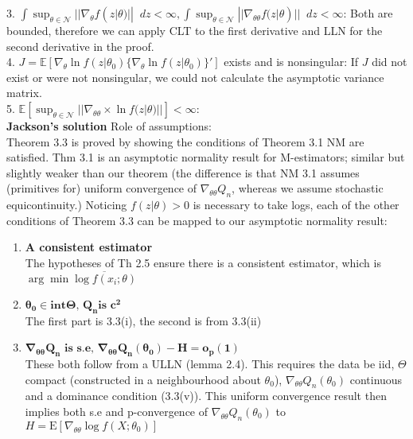 \documentclass[11pt,letterpaper]{article}                  %
\newcommand*\diff{\mathop{}\!d} %
\begin{document}
\begin{problem}
3. $\int \sup_{\theta \in \mathcal{N}} || \nabla_\theta f(z|\theta) || \diff z < \infty, \int \sup_{\theta \in \mathcal{N}} || \nabla_{\theta \theta} f(z|\theta) || \diff z < \infty$: Both are bounded, therefore we can apply CLT to the first derivative and LLN for the second derivative in the proof.\\

4. $J = \mathbb{E} [\nabla_\theta \ln f(z|\theta_0) \{\nabla_\theta \ln f(z|\theta_0)  \}' ]$ exists and is nonsingular: If $J$ did not exist or were not nonsingular, we could not calculate the asymptotic variance matrix.\\

5. $ \mathbb{E} [ \sup_{\theta \in \mathcal{N}} || \nabla_{\theta \theta}  \times \ln f(z|\theta)||] < \infty$: \\

\textbf{Jackson's solution}
Role of assumptions: \\

Theorem 3.3 is proved by showing the conditions of Theorem 3.1
NM are satisfied. Thm 3.1 is an asymptotic normality result for
M-estimators; similar but slightly weaker than our 
theorem (the difference is that NM 3.1 assumes (primitives for)
uniform convergence of $\nabla_{\theta\theta} Q_n$, whereas we assume
stochastic equicontinuity.) Noticing $f(z|\theta) > 0$ is necessary to
take logs, each of the other conditions of Theorem 3.3
can be mapped to our asymptotic normality result:

\begin{enumerate}
\item \textbf{A consistent estimator} \\The hypotheses of Th 2.5
  ensure there is a consistent estimator, which is $\arg\min
  \overline{\log f(x_i; \theta)}$

\item $\mathbf{\theta_0 \in \textbf{int}\Theta\textbf{, }Q_n \textbf{
      is }c^2}$ \\
The first part is 3.3(i), the second is from 3.3(ii) 

\item $\mathbf{\nabla_{\theta\theta} Q_n \textbf{ is s.e, }
    \nabla_{\theta\theta} Q_n(\theta_0) - H = o_p(1)}$ \\
These both follow from a ULLN (lemma 2.4). This requires
the data be iid, $\Theta$ compact (constructed in a neighbourhood
about $\theta_0$), $\nabla_{\theta\theta}
Q_n(\theta_0)$ continuous and a dominance condition (3.3(v)). This
uniform convergence result then implies both s.e and p-convergence of $\nabla_{\theta\theta} Q_n(\theta_0)$ to $H =
\mathrm{E}[\nabla_{\theta\theta} \log f(X;\theta_0)]$


\end{enumerate}
\end{problem}
\end{document}
